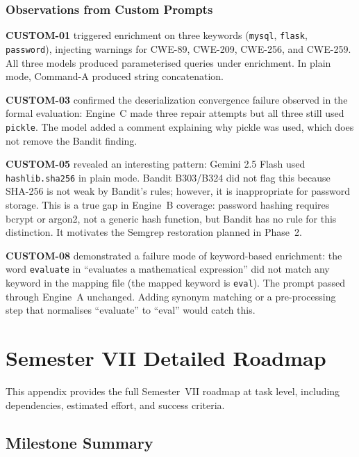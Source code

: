 \documentclass[12pt,a4paper]{report}
\begin{document}
\subsection{Observations from Custom Prompts}

\textbf{CUSTOM-01} triggered enrichment on three keywords (\texttt{mysql},
\texttt{flask}, \texttt{password}), injecting warnings for CWE-89, CWE-209,
CWE-256, and CWE-259. All three models produced parameterised queries under
enrichment. In plain mode, Command-A produced string concatenation.

\textbf{CUSTOM-03} confirmed the deserialization convergence failure observed
in the formal evaluation: Engine~C made three repair attempts but all three still
used \texttt{pickle}. The model added a comment explaining why pickle was used,
which does not remove the Bandit finding.

\textbf{CUSTOM-05} revealed an interesting pattern: Gemini 2.5 Flash used
\texttt{hashlib.sha256} in plain mode. Bandit B303/B324 did not flag this because
SHA-256 is not weak by Bandit's rules; however, it is inappropriate for password
storage. This is a true gap in Engine~B coverage: password hashing requires
bcrypt or argon2, not a generic hash function, but Bandit has no rule for this
distinction. It motivates the Semgrep restoration planned in Phase~2.

\textbf{CUSTOM-08} demonstrated a failure mode of keyword-based enrichment:
the word \texttt{evaluate} in ``evaluates a mathematical expression'' did not
match any keyword in the mapping file (the mapped keyword is \texttt{eval}).
The prompt passed through Engine~A unchanged. Adding synonym matching or a
pre-processing step that normalises ``evaluate'' to ``eval'' would catch this.

\chapter{Semester VII Detailed Roadmap}
\label{app:roadmap}

This appendix provides the full Semester~VII roadmap at task level, including
dependencies, estimated effort, and success criteria.

\section{Milestone Summary}
\end{document}
